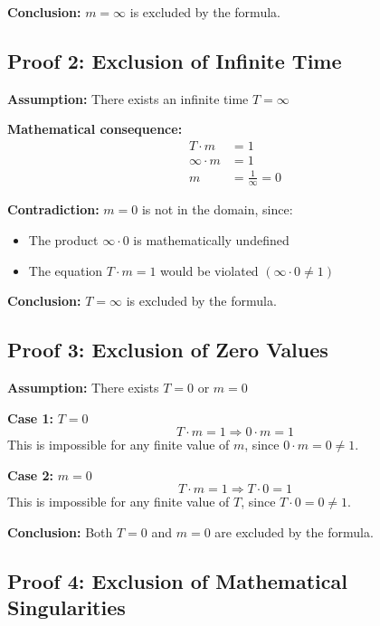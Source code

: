 \documentclass[12pt,a4paper]{article}
\theoremstyle{definition}
\theoremstyle{remark}
\begin{document}
	\textbf{Conclusion:} $m = \infty$ is excluded by the formula.
	
	\subsection{Proof 2: Exclusion of Infinite Time}
	
	\textbf{Assumption:} There exists an infinite time $T = \infty$
	
	\textbf{Mathematical consequence:}
	\begin{align}
		T \cdot m &= 1\\
		\infty \cdot m &= 1\\
		m &= \frac{1}{\infty} = 0
	\end{align}
	
	\textbf{Contradiction:} $m = 0$ is not in the domain, since:
	\begin{itemize}
		\item The product $\infty \cdot 0$ is mathematically undefined
		\item The equation $T \cdot m = 1$ would be violated $(\infty \cdot 0 \neq 1)$
	\end{itemize}
	
	\textbf{Conclusion:} $T = \infty$ is excluded by the formula.
	
	\subsection{Proof 3: Exclusion of Zero Values}
	
	\textbf{Assumption:} There exists $T = 0$ or $m = 0$
	
	\textbf{Case 1:} $T = 0$
	\begin{equation}
		T \cdot m = 1 \Rightarrow 0 \cdot m = 1
	\end{equation}
	This is impossible for any finite value of $m$, since $0 \cdot m = 0 \neq 1$.
	
	\textbf{Case 2:} $m = 0$
	\begin{equation}
		T \cdot m = 1 \Rightarrow T \cdot 0 = 1
	\end{equation}
	This is impossible for any finite value of $T$, since $T \cdot 0 = 0 \neq 1$.
	
	\textbf{Conclusion:} Both $T = 0$ and $m = 0$ are excluded by the formula.
	
	\subsection{Proof 4: Exclusion of Mathematical Singularities}
	
\end{document}
